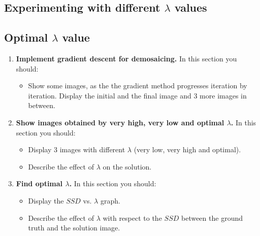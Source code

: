 \documentclass{paper}
\begin{document}
\subsection{Experimenting with different $\lambda$ values}
\subsection{Optimal $\lambda$ value}

\begin{enumerate}
\item \textbf{Implement gradient descent for demosaicing.} In this section you should:

\begin{itemize}
\item Show some images, as the the gradient method progresses iteration by iteration. Display the initial and the final image and 3 more images in between.
\end{itemize}

\item \textbf{Show images obtained by very high, very low and optimal $\lambda$.} In this section you should:

\begin{itemize}
\item Display 3 images with different $\lambda$ (very low, very high and optimal).
\item Describe the effect of $\lambda$ on the solution.
\end{itemize}

\item \textbf{ Find optimal $\lambda$.} In this section you should:

\begin{itemize}
\item Display the $SSD$ vs. $\lambda$ graph.
\item Describe the effect of $\lambda$ with respect to the $SSD$ between the ground truth and the solution image.
\end{itemize}


\end{enumerate}


 
\end{document}
